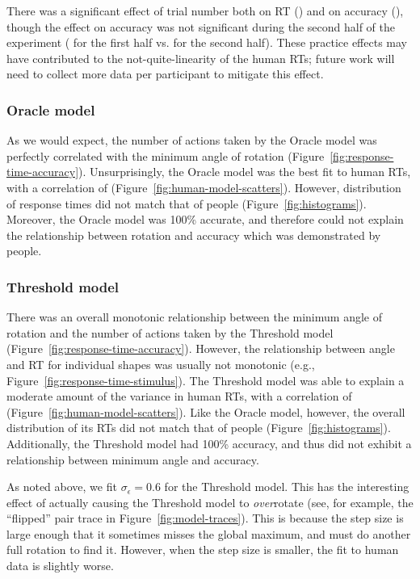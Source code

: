 \documentclass[10pt,letterpaper]{article}
\newcommand{\Oc}[0]{Oracle}
\newcommand{\Th}[0]{Threshold}
\begin{document}
There was a significant effect of trial number both on RT
(\ExpTrialTimeCorr{}) and on accuracy (\ExpTrialAccuracyCorr{}),
though the effect on accuracy was not significant during the second
half of the experiment (\ExpaTrialAccuracyCorr{} for the first half
vs. \ExpbTrialAccuracyCorr{} for the second half). These practice
effects may have contributed to the not-quite-linearity of the human
RTs; future work will need to collect more data per participant to
mitigate this effect.

\subsubsection{\Oc{} model}

As we would expect, the number of actions taken by the \Oc{} model was
perfectly correlated with the minimum angle of rotation
(Figure~\ref{fig:response-time-accuracy}). Unsurprisingly, the \Oc{}
model was the best fit to human RTs, with a correlation of
\OcTimeCorr{} (Figure~\ref{fig:human-model-scatters}).  However,
distribution of response times did not match that of people
(Figure~\ref{fig:histograms}). Moreover, the \Oc{} model was 100\%
accurate, and therefore could not explain the relationship between
rotation and accuracy which was demonstrated by people.

\subsubsection{\Th{} model}

There was an overall monotonic relationship between the minimum angle
of rotation and the number of actions taken by the \Th{} model
(Figure~\ref{fig:response-time-accuracy}). However, the relationship
between angle and RT for individual shapes was usually not monotonic
(e.g., Figure~\ref{fig:response-time-stimulus}).  The \Th{} model was
able to explain a moderate amount of the variance in human RTs, with a
correlation of \ThTimeCorr{}
(Figure~\ref{fig:human-model-scatters}). Like the \Oc{} model,
however, the overall distribution of its RTs did not match that of
people (Figure~\ref{fig:histograms}). Additionally, the \Th{} model
had 100\% accuracy, and thus did not exhibit a relationship between
minimum angle and accuracy.

As noted above, we fit $\sigma_\epsilon=0.6$ for the \Th{} model. This
has the interesting effect of actually causing the \Th{} model to
\textit{over}rotate (see, for example, the ``flipped'' pair trace in
Figure~\ref{fig:model-traces}). This is because the step size is large
enough that it sometimes misses the global maximum, and must do
another full rotation to find it. However, when the step size is
smaller, the fit to human data is slightly worse.
\end{document}

